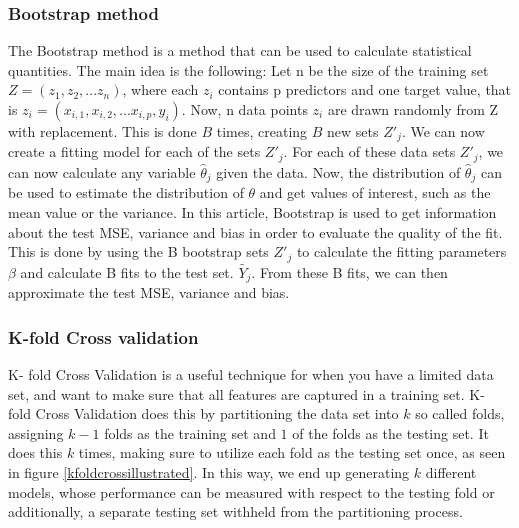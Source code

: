 \documentclass[11pt,a4paper,titlepage]{article}
\begin{document}
\subsubsection{Bootstrap method}
The Bootstrap method is a method that can be used to calculate statistical quantities. The main idea is the following: Let n be the size of the training set $Z=(z_1,z_2,...z_n)$, where each $z_i$ contains p predictors and one target value, that is $z_i=(x_{i,1},x_{i,2},...x_{i,p},y_i)$. Now, n data points $z_i$ are drawn randomly from Z with replacement. This is done $B$ times, creating $B$ new sets $Z'_j$. We can now create a fitting model for each of the sets  $Z'_j$. For each of these data sets $Z'_j$, we can now calculate any variable $\hat\theta_j$ given the data. Now, the distribution of $\hat\theta_j$ can be used to estimate the distribution of $\theta$ and get values of interest, such as the mean value or the variance. In this article, Bootstrap is used to get information about the test MSE, variance and bias in order to evaluate the quality of the fit. This is done by using the B bootstrap sets $Z'_j$ to calculate the fitting parameters $\beta$ and calculate B fits to the test set. $\tilde{Y_j}$. From these B fits, we can then approximate the test MSE, variance and bias.
\subsubsection{K-fold Cross validation}
K- fold Cross Validation is a useful technique for when you have a limited data set, and want to make sure that all features are captured in a training set. K- fold Cross Validation does this by partitioning the data set into $k$ so called folds, assigning $k-1$ folds as the training set and $1$ of the folds as the testing set. It does this $k$ times, making sure to utilize each fold as the testing set once, as seen in figure \ref{kfoldcrossillustrated}. In this way, we end up generating $k$ different models, whose performance can be measured with respect to the testing fold or additionally, a separate testing set withheld from the partitioning process.
\end{document}
